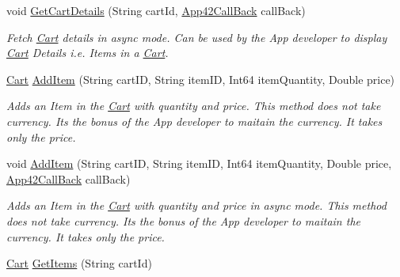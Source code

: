 \begin{DoxyCompactItemize}
void \hyperlink{classcom_1_1shephertz_1_1app42_1_1paas_1_1sdk_1_1csharp_1_1shopping_1_1_cart_service_a5764b07a2e1ba9a49bf022dc40f12b3c}{Get\+Cart\+Details} (String cart\+Id, \hyperlink{interfacecom_1_1shephertz_1_1app42_1_1paas_1_1sdk_1_1csharp_1_1_app42_call_back}{App42\+Call\+Back} call\+Back)
\begin{DoxyCompactList}\small\item\em Fetch \hyperlink{classcom_1_1shephertz_1_1app42_1_1paas_1_1sdk_1_1csharp_1_1shopping_1_1_cart}{Cart} details in async mode. Can be used by the App developer to display \hyperlink{classcom_1_1shephertz_1_1app42_1_1paas_1_1sdk_1_1csharp_1_1shopping_1_1_cart}{Cart} Details i.\+e. Items in a \hyperlink{classcom_1_1shephertz_1_1app42_1_1paas_1_1sdk_1_1csharp_1_1shopping_1_1_cart}{Cart}. \end{DoxyCompactList}\item 
\hyperlink{classcom_1_1shephertz_1_1app42_1_1paas_1_1sdk_1_1csharp_1_1shopping_1_1_cart}{Cart} \hyperlink{classcom_1_1shephertz_1_1app42_1_1paas_1_1sdk_1_1csharp_1_1shopping_1_1_cart_service_adca488adb320daff8369c1d7eb32c529}{Add\+Item} (String cart\+I\+D, String item\+I\+D, Int64 item\+Quantity, Double price)
\begin{DoxyCompactList}\small\item\em Adds an Item in the \hyperlink{classcom_1_1shephertz_1_1app42_1_1paas_1_1sdk_1_1csharp_1_1shopping_1_1_cart}{Cart} with quantity and price. This method does not take currency. Its the bonus of the App developer to maitain the currency. It takes only the price. \end{DoxyCompactList}\item 
void \hyperlink{classcom_1_1shephertz_1_1app42_1_1paas_1_1sdk_1_1csharp_1_1shopping_1_1_cart_service_abe86ad6e4a4ddf9656afa8b03a0cf8be}{Add\+Item} (String cart\+I\+D, String item\+I\+D, Int64 item\+Quantity, Double price, \hyperlink{interfacecom_1_1shephertz_1_1app42_1_1paas_1_1sdk_1_1csharp_1_1_app42_call_back}{App42\+Call\+Back} call\+Back)
\begin{DoxyCompactList}\small\item\em Adds an Item in the \hyperlink{classcom_1_1shephertz_1_1app42_1_1paas_1_1sdk_1_1csharp_1_1shopping_1_1_cart}{Cart} with quantity and price in async mode. This method does not take currency. Its the bonus of the App developer to maitain the currency. It takes only the price. \end{DoxyCompactList}\item 
\hyperlink{classcom_1_1shephertz_1_1app42_1_1paas_1_1sdk_1_1csharp_1_1shopping_1_1_cart}{Cart} \hyperlink{classcom_1_1shephertz_1_1app42_1_1paas_1_1sdk_1_1csharp_1_1shopping_1_1_cart_service_a0bf5004e3e9cad7c2dc692e0e4c28f16}{Get\+Items} (String cart\+Id)

\end{DoxyCompactItemize}
